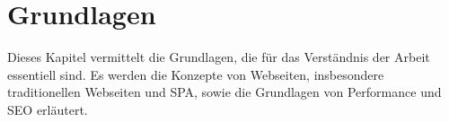 
\section{Grundlagen}
Dieses Kapitel vermittelt die Grundlagen, die für das Verständnis der Arbeit essentiell sind.
Es werden die Konzepte von Webseiten, insbesondere traditionellen Webseiten und \ac{SPA}, sowie die Grundlagen von Performance und \ac{SEO} erläutert.

